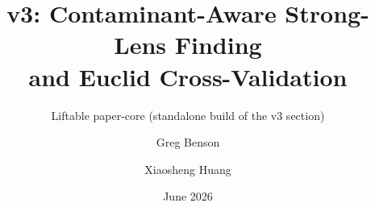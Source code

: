 \documentclass[11pt,letterpaper]{article}
\title{\cnet{} v3: Contaminant-Aware Strong-Lens Finding\\ and Euclid Cross-Validation}
\author{Greg Benson \and Xiaosheng Huang}
\date{June 2026}
\begin{document}
\maketitle
\subtitle{Liftable paper-core (standalone build of the v3 section)}





\end{document}
